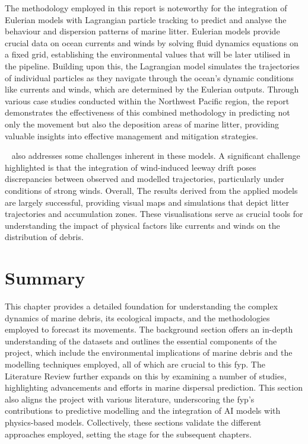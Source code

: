The methodology employed in this report is noteworthy for the integration of Eulerian models with Lagrangian particle tracking to predict and analyse the behaviour and dispersion patterns of marine litter. Eulerian models provide crucial data on ocean currents and winds by solving fluid dynamics equations on a fixed grid, establishing the environmental values that will be later utilised in the pipeline. Building upon this, the Lagrangian  model simulates the trajectories of individual particles as they navigate through the ocean's dynamic conditions like currents and winds, which are determined by the Eulerian outputs. Through various case studies conducted within the Northwest Pacific region, the report demonstrates the effectiveness of this combined methodology in predicting not only the movement but also the deposition areas of marine litter, providing valuable insights into effective management and mitigation strategies.

~\cite{46} also addresses some challenges inherent in these models. A significant challenge highlighted is that the integration of wind-induced leeway drift poses discrepancies between observed and modelled trajectories, particularly under conditions of strong winds. Overall, The results derived from the applied models are largely successful, providing visual maps and simulations that depict litter trajectories and accumulation zones. These visualisations serve as crucial tools for understanding the impact of physical factors like currents and winds on the distribution of debris.

\section{Summary}
\label{sec:2.3}

This chapter provides a detailed foundation for understanding the complex dynamics of marine debris, its ecological impacts, and the methodologies employed to forecast its movements. The background section offers an in-depth understanding of the datasets and outlines the essential components of the project, which include the environmental implications of marine debris and the modelling techniques employed, all of which are crucial to this \acrshort{fyp}. The Literature Review further expands on this by examining a number of studies, highlighting advancements and efforts in marine dispersal prediction. This section also aligns the project with various literature, underscoring the \acrshort{fyp}’s contributions to predictive modelling and the integration of AI models with physics-based models. Collectively, these sections validate the different approaches employed, setting the stage for the subsequent chapters.
